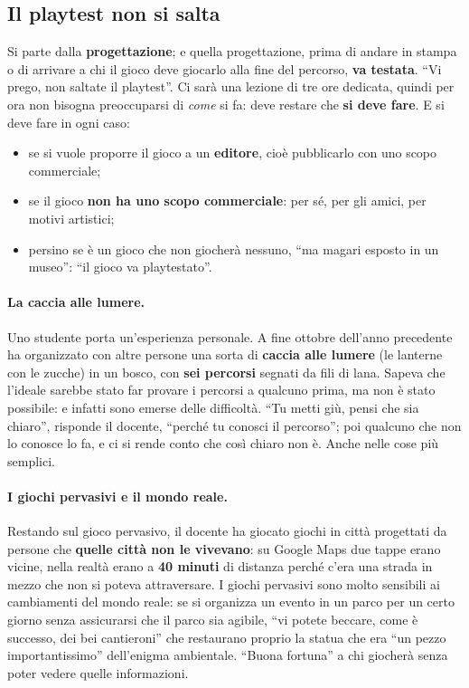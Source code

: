 \subsection{Il playtest non si salta}

Si parte dalla \textbf{progettazione}; e quella progettazione, prima di andare in
stampa o di arrivare a chi il gioco deve giocarlo alla fine del percorso,
\textbf{va testata}. ``Vi prego, non saltate il playtest''. Ci sarà una lezione
di tre ore dedicata, quindi per ora non bisogna preoccuparsi di \emph{come} si
fa: deve restare che \textbf{si deve fare}. E si deve fare in ogni caso:
\begin{itemize}
  \item se si vuole proporre il gioco a un \textbf{editore}, cioè pubblicarlo con
        uno scopo commerciale;
  \item se il gioco \textbf{non ha uno scopo commerciale}: per sé, per gli amici,
        per motivi artistici;
  \item persino se è un gioco che non giocherà nessuno, ``ma magari esposto in un
        museo'': ``il gioco va playtestato''.
\end{itemize}

\paragraph{La caccia alle lumere.} Uno studente porta un'esperienza personale.
A fine ottobre dell'anno precedente ha organizzato con altre persone una sorta
di \textbf{caccia alle lumere} (le lanterne con le zucche) in un bosco, con
\textbf{sei percorsi} segnati da fili di lana. Sapeva che l'ideale sarebbe
stato far provare i percorsi a qualcuno prima, ma non è stato possibile: e
infatti sono emerse delle difficoltà. ``Tu metti giù, pensi che sia chiaro'',
risponde il docente, ``perché tu conosci il percorso''; poi qualcuno che non lo
conosce lo fa, e ci si rende conto che così chiaro non è. Anche nelle cose più
semplici.

\paragraph{I giochi pervasivi e il mondo reale.} Restando sul gioco pervasivo,
il docente ha giocato giochi in città progettati da persone che \textbf{quelle
città non le vivevano}: su Google Maps due tappe erano vicine, nella realtà
erano a \textbf{40 minuti} di distanza perché c'era una strada in mezzo che non
si poteva attraversare. I giochi pervasivi sono molto sensibili ai cambiamenti
del mondo reale: se si organizza un evento in un parco per un certo giorno senza
assicurarsi che il parco sia agibile, ``vi potete beccare, come è successo, dei
bei cantieroni'' che restaurano proprio la statua che era ``un pezzo
importantissimo'' dell'enigma ambientale. ``Buona fortuna'' a chi giocherà
senza poter vedere quelle informazioni.

